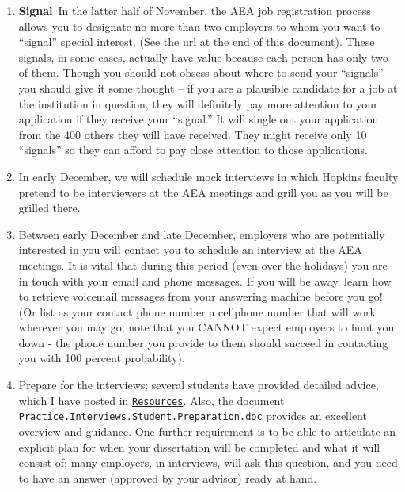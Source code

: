 \documentclass{\classes/econtex}
\begin{document}
\begin{enumerate}
\item \ifdvi\hypertarget{Signal}{\textbf{Signal}~}\fi In the latter half of November, the AEA job registration process 
  allows you to designate no more than two employers to whom you want
  to ``signal'' special interest.  (See the url at the end of this
  document).  These signals, in some cases, actually have value because 
  each person has only two of them.  Though you should not obsess about 
  where to send your ``signals'' you should give it some thought -- if you
  are a plausible candidate for a job at the institution in question, they
  will definitely pay more attention to your application if they receive your 
  ``signal.''  It will single out your application from the 400 others they will have received.
  They might receive only 10 ``signals'' so they can afford to pay close attention
  to those applications.

  
  \hypertarget{Mock-Interviews}{}
\item In early December, we will schedule mock interviews in which
  Hopkins faculty pretend to be interviewers at the AEA meetings and
  grill you as you will be grilled there.
  
  \hypertarget{Be-Reachable}{}
\item Between early December and late December, employers who are
  potentially interested in you will contact you to schedule an
  interview at the AEA meetings.  It is vital that during this period
  (even over the holidays) you are in touch with your email and phone
  messages.  If you will be away, learn how to retrieve voicemail
  messages from your answering machine before you go!  (Or list as
  your contact phone number a cellphone number that will work wherever
  you may go; note that you CANNOT expect employers to hunt you down -
  the phone number you provide to them should succeed in contacting
  you with 100 percent probability).
  
  \hypertarget{Prep-For-Interviews}{}
\item Prepare for the interviews; several students have provided
  detailed advice, which I have posted in \href{\treeurl/Resources}{\texttt{Resources}}.  Also, the document
  \texttt{Practice.Interviews.Student.Preparation.doc} provides an
  excellent overview and guidance. One further requirement is to be
  able to articulate an explicit plan for when your dissertation will
  be completed and what it will consist of; many employers, in
  interviews, will ask this question, and you need to have an answer
  (approved by your advisor) ready at hand. \ifdvi\hypertarget{InterviewPrep}{}\fi
  

\end{enumerate}
\end{document}
